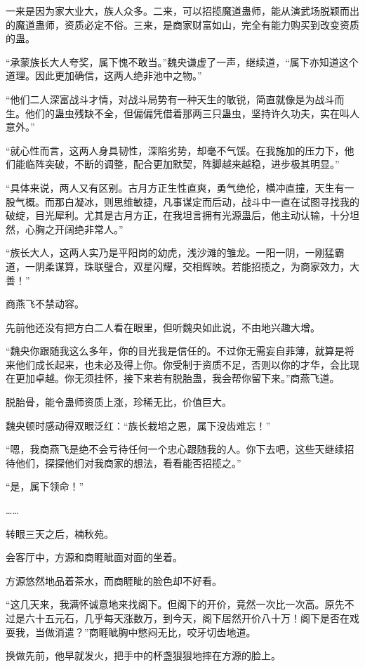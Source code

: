 \begin{this_body}
一来是因为家大业大，族人众多。二来，可以招揽魔道蛊师，能从演武场脱颖而出的魔道蛊师，资质必定不俗。三来，是商家财富如山，完全有能力购买到改变资质的蛊。

“承蒙族长大人夸奖，属下愧不敢当。”魏央谦虚了一声，继续道，“属下亦知道这个道理。因此更加确信，这两人绝非池中之物。”

“他们二人深富战斗才情，对战斗局势有一种天生的敏锐，简直就像是为战斗而生。他们的蛊虫残缺不全，但偏偏凭借着那两三只蛊虫，坚持许久功夫，实在叫人意外。”

“就心性而言，这两人身具韧性，深陷劣势，却毫不气馁。在我施加的压力下，他们能临阵突破，不断的调整，配合更加默契，阵脚越来越稳，进步极其明显。”

“具体来说，两人又有区别。古月方正生性直爽，勇气绝伦，横冲直撞，天生有一股气概。而那白凝冰，则思维敏捷，凡事谋定而后动，战斗中一直在试图寻找我的破绽，目光犀利。尤其是古月方正，在我坦言拥有光源蛊后，他主动认输，十分坦然，心胸之开阔绝非常人。”

“族长大人，这两人实乃是平阳岗的幼虎，浅沙滩的雏龙。一阳一阴，一刚猛霸道，一阴柔谋算，珠联璧合，双星闪耀，交相辉映。若能招揽之，为商家效力，大善！”

商燕飞不禁动容。

先前他还没有把方白二人看在眼里，但听魏央如此说，不由地兴趣大增。

“魏央你跟随我这么多年，你的目光我是信任的。不过你无需妄自菲薄，就算是将来他们成长起来，也未必及得上你。你受制于资质不足，否则以你的才华，会比现在更加卓越。你无须挂怀，接下来若有脱胎蛊，我会帮你留下来。”商燕飞道。

脱胎骨，能令蛊师资质上涨，珍稀无比，价值巨大。

魏央顿时感动得双眼泛红：“族长栽培之恩，属下没齿难忘！”

“嗯，我商燕飞是绝不会亏待任何一个忠心跟随我的人。你下去吧，这些天继续招待他们，探探他们对我商家的想法，看看能否招揽之。”

“是，属下领命！”

……

转眼三天之后，楠秋苑。

会客厅中，方源和商睚眦面对面的坐着。

方源悠然地品着茶水，而商睚眦的脸色却不好看。

“这几天来，我满怀诚意地来找阁下。但阁下的开价，竟然一次比一次高。原先不过是六十五元石，几乎每天涨数万，到今天，阁下居然开价八十万！阁下是否在戏耍我，当做消遣？”商睚眦胸中憋闷无比，咬牙切齿地道。

换做先前，他早就发火，把手中的杯盏狠狠地摔在方源的脸上。


\end{this_body}
